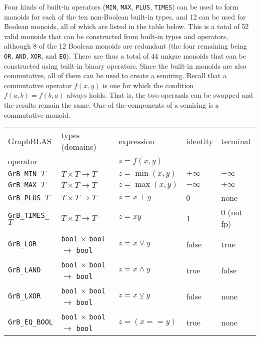\documentclass[12pt]{article}
\begin{document}
Four kinds of built-in operators (\verb'MIN', \verb'MAX', \verb'PLUS',
\verb'TIMES') can be used to form monoids for each of the ten non-Boolean
built-in types, and 12 can be used for Boolean monoids, all of which are listed
in the table below.  This is a total of 52 valid monoids that can be
constructed from built-in types and operators, although 8 of the 12 Boolean
monoids are redundant (the four remaining being \verb'OR', \verb'AND',
\verb'XOR', and \verb'EQ').  There are thus a total of 44 unique monoids that
can be constructed using built-in binary operators.  Since the built-in monoids
are also commutative, all of them can be used to create a semiring.  Recall
that a commutative operator $f(x,y)$ is one for which the condition
$f(a,b)=f(b,a)$ always holds.  That is, the two operands can be swapped and the
results remain the same.  One of the components of a semiring is a commutative
monoid.


\vspace{0.2in}
{\footnotesize
\begin{tabular}{lllll}
\hline
GraphBLAS             & types (domains)            & expression      & identity  & terminal \\
operator              &                            & $z=f(x,y)$      &           & \\
\hline
\verb'GrB_MIN_'$T$    & $T \times T \rightarrow T$ & $z = \min(x,y)$ & $+\infty$ & $-\infty$ \\
\verb'GrB_MAX_'$T$    & $T \times T \rightarrow T$ & $z = \max(x,y)$ & $-\infty$ & $+\infty$ \\
\verb'GrB_PLUS_'$T$   & $T \times T \rightarrow T$ & $z = x+y$       & 0         & none \\
\verb'GrB_TIMES_'$T$  & $T \times T \rightarrow T$ & $z = xy$        & 1         & 0 (not fp) \\
\hline
\verb'GrB_LOR'        & \verb'bool' $\times$ \verb'bool' $\rightarrow$ \verb'bool' & $z = x \vee    y $ & false & true  \\
\verb'GrB_LAND'       & \verb'bool' $\times$ \verb'bool' $\rightarrow$ \verb'bool' & $z = x \wedge  y $ & true  & false \\
\verb'GrB_LXOR'       & \verb'bool' $\times$ \verb'bool' $\rightarrow$ \verb'bool' & $z = x \veebar y $ & false & none \\
\verb'GrB_EQ_BOOL'    & \verb'bool' $\times$ \verb'bool' $\rightarrow$ \verb'bool' & $z =(x ==      y)$ & true  & none \\
\hline
\end{tabular}
}
\vspace{0.2in}
\end{document}
